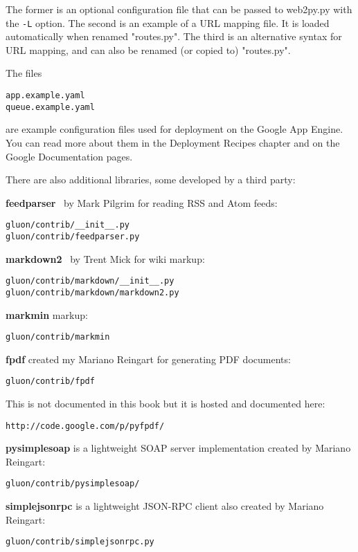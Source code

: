 \documentclass[justified,sixbynine,notoc]{tufte-book}
\def\ft{\small\tt}
\def\inxx#1{\index{#1}}
\begin{document}
\begin{fullwidth}
The former is an optional configuration file that can be passed to web2py.py with the {\ft -L} option. The second is an example of a URL mapping file. It is loaded automatically when renamed "routes.py". The third is an alternative syntax for URL mapping, and can also be renamed (or copied to) "routes.py".

The files
\begin{lstlisting}
app.example.yaml
queue.example.yaml
\end{lstlisting}
\noindent are example configuration files used for deployment on the Google App Engine. You can read more about them in the Deployment Recipes chapter and on the Google Documentation pages.

There are also additional libraries, some developed by a third party:

{\bf feedparser}~\cite{feedparser}  by Mark Pilgrim for reading RSS and Atom feeds:
\begin{lstlisting}
gluon/contrib/__init__.py
gluon/contrib/feedparser.py
\end{lstlisting}

{\bf markdown2}~\cite{markdown2}  by Trent Mick for wiki markup:
\begin{lstlisting}
gluon/contrib/markdown/__init__.py
gluon/contrib/markdown/markdown2.py
\end{lstlisting}

{\bf markmin} markup:
\begin{lstlisting}
gluon/contrib/markmin
\end{lstlisting}

{\bf fpdf} created my Mariano Reingart for generating PDF documents:
\begin{lstlisting}
gluon/contrib/fpdf
\end{lstlisting}
This is not documented in this book but it is hosted and documented here:
\begin{lstlisting}[keywords={}]
http://code.google.com/p/pyfpdf/
\end{lstlisting}

{\bf pysimplesoap} is a lightweight SOAP server implementation created by Mariano Reingart:

\begin{lstlisting}
gluon/contrib/pysimplesoap/
\end{lstlisting}

{\bf simplejsonrpc} is a lightweight JSON-RPC client also created by Mariano Reingart: \inxx{jsonrpc}

\begin{lstlisting}
gluon/contrib/simplejsonrpc.py
\end{lstlisting}


\end{fullwidth}
\end{document}

